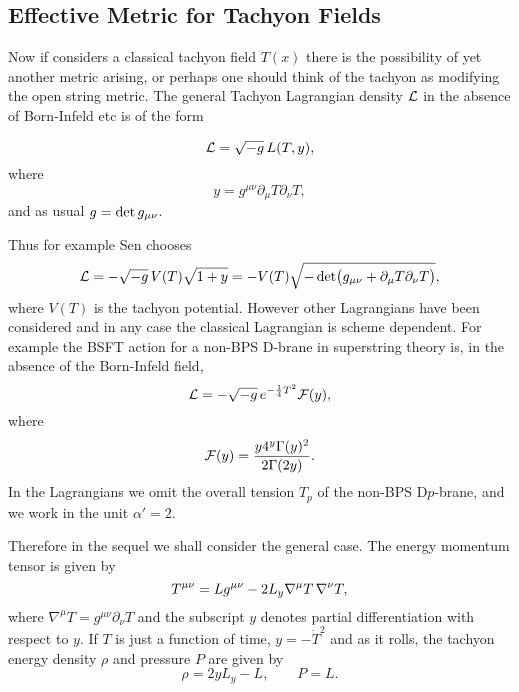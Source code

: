 \documentclass[a4paper,12pt]{article}
\begin{document}
\subsection{Effective Metric for Tachyon Fields}

Now if considers a classical  tachyon field $T(x)$ there is the
possibility of yet another metric arising, or perhaps one
should think of the tachyon as modifying the open string metric.
The general Tachyon Lagrangian density $\cal L$ in the absence of
Born-Infeld etc is of the form

\begin{equation} 
{\cal L} =\sqrt{-g} \thinspace  L(T, y),  
\end{equation}
where
\begin{equation} 
y= g^{\mu \nu}
\partial_\mu  T \partial_\nu T, 
\end{equation} 
and as usual $g = {\rm det}\thinspace g_{\mu \nu}$.


Thus for example Sen chooses \cite{rolling}
\begin{equation} 
{\cal L}= -\sqrt{-g} \thinspace
V(T) \sqrt{1+y} = -V(T) \sqrt{-\det \bigl(  g_{\mu \nu}
+\partial_\mu T
\partial_\nu T \bigr ) },  
\label{sencho}
\end{equation} 
where $V(T)$ is the tachyon potential.
However other Lagrangians have been considered and in any case the
classical Lagrangian is scheme dependent. For example the BSFT
action for a non-BPS D-brane in superstring theory 
is, in the absence of the Born-Infeld field, \cite{kutasov}
\begin{equation}
{\cal L} = - \sqrt {-g} \thinspace  e^{ - \frac{1}{4} T^2 }
{\cal F}(y), 
\end{equation} 
where 
\begin{equation} 
{\cal F}(y) = \frac{y 4^y \Gamma (y) ^2}{2 \Gamma (2 y) }.
\label{bsftf}
\end{equation}
In the Lagrangians we 
omit the overall tension $T_p$ of the non-BPS D$p$-brane,
and we work in the unit $\alpha'=2$. 


Therefore in the sequel we shall consider the general case. The
energy momentum tensor is given by 
\begin{equation} 
T^{\mu \nu} = L g^{\mu \nu} -2 L_y \nabla ^\mu T 
\thinspace \nabla ^\nu T, 
\end{equation} 
where 
$\nabla ^\mu T = g^{\mu \nu }\partial_\nu T$ and the subscript $y$
denotes partial differentiation with respect to $y$. If  $T$ is
just a function of time, $y=-\dot T^2 $ and as it rolls, the
tachyon energy density $\rho$ and pressure $P$ are given by 
\begin{equation}
\rho = 2yL_y -L, \qquad P= L. 
\end{equation}
\end{document}
